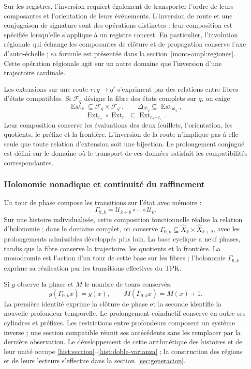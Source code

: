 Sur les registres, l'inversion requiert également de transporter l'ordre
de leurs composantes et l'orientation de leurs événements. L'inversion de
route et une conjugaison de signature sont des opérations distinctes : leur
composition est spécifiée lorsqu'elle s'applique à un registre concret. En
particulier, l'involution régionale qui échange les composantes de
clôture et de propagation conserve l'axe d'auto-échelle ; sa formule est
présentée dans la section~\ref{mono-ampl:regiones}. Cette opération régionale
agit sur un autre domaine que l'inversion d'une trajectoire cardinale.

Les extensions sur une route \(r:q\to q'\) s'expriment par des relations entre fibres d'états compatibles. Si \(\mathcal F_q\) désigne la fibre des états complets sur \(q\), on exige
\[
 \operatorname{Ext}_r\subseteq\mathcal F_q\times\mathcal F_{q'},
 \qquad \Delta_{\mathcal F_q}\subseteq
        \operatorname{Ext}_{\operatorname{id}_q},
\]
\[
 \operatorname{Ext}_{r_2}\circ\operatorname{Ext}_{r_1}
       \subseteq\operatorname{Ext}_{r_2\circ r_1}.
\]
Leur composition conserve les évaluations des deux feuillets, l'orientation,
les quotients, le préfixe et la frontière. L'inversion de la route
n'implique pas à elle seule que toute relation d'extension soit une bijection.
Le prolongement conjugué est défini sur le domaine où le transport de
ces données satisfait les compatibilités correspondantes.

\subsubsection{Holonomie nonadique et continuité du raffinement}
\label{tpk-int:holonomia}

Un tour de phase compose les transitions sur l'état avec mémoire :
\begin{equation}
 \Gamma_{9,k}=\mathcal U_{k+8}\circ\cdots\circ\mathcal U_k.
 \label{tpk-int:gamma}
\end{equation}
Sur une histoire individualisée, cette composition fonctionnelle réalise la relation d'holonomie ; dans le domaine complet, on conserve \(\Gamma_{9,k}\subseteq\widehat X_k\times\widehat X_{k+9}\), avec les prolongements admissibles développés plus loin. La base cyclique a neuf phases, tandis que la fibre conserve la trajectoire, les quotients et la frontière. La monodromie est l'action d'un tour de cette base sur les fibres ; l'holonomie \(\Gamma_{9,k}\) exprime sa réalisation par les transitions effectives du TPK.

Si \(g\) observe la phase et \(M\) le nombre de tours conservés,
\[
 g(\Gamma_{9,k}x)=g(x),\qquad M(\Gamma_{9,k}x)=M(x)+1.
\]
La première identité exprime la clôture de phase et la seconde identifie
la nouvelle profondeur temporelle. Le prolongement coinductif conserve
en outre ses cylindres et préfixes. Les restrictions entre profondeurs
composent un système inverse ; une section compatible réunit ses
antécédents sans les remplacer par la dernière observation. Le développement
de cette arithmétique des histoires et de leur unité occupe
\ref{hist:seccion}--\ref{hist:doble-varianza} ; la construction des
régions et de leurs lecteurs s'effectue dans la section~\ref{sec:generacion}.

